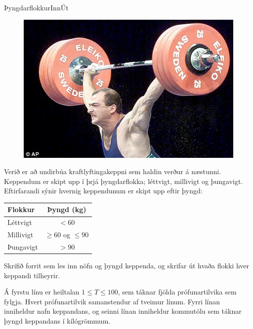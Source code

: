 \begin{problem}{Þyngdarflokkur}{Inn}{Út}{~}{~}

	\begin{figure}
		\vspace{-25pt}
		\begin{center}
			\includegraphics[scale=0.30]{../Thyngdarflokkur/heavyLifting.jpg}
		\end{center}
		\vspace{-30pt}
	\end{figure}

	Verið er að undirbúa kraftlyftingakeppni sem haldin verður á næstunni. Keppendum er skipt upp í þrjá þyngdarflokka; léttvigt, millivigt og þungavigt. Eftirfarandi sýnir hvernig keppendunum er skipt upp eftir þyngd:

	\begin{center}
		\hspace{-10pt}
		\begin{tabular}{lc}
			\hline
			Flokkur & Þyngd (kg) \\
			\hline
			Léttvigt & $< 60$ \\
			Millivigt & $\geq 60$ og $\leq 90$ \\
			Þungavigt & $> 90$ \\
			\hline
		\end{tabular}
	\end{center}

	Skrifið forrit sem les inn nöfn og þyngd keppenda, og skrifar út hvaða flokki hver keppandi tilheyrir.

	\Input
		Á fyrstu línu er heiltalan $1 \leq T \leq 100$, sem táknar fjölda prófunartilvika sem fylgja. Hvert prófunartilvik samanstendur af tveimur línum. Fyrri línan inniheldur nafn keppandans, og seinni línan inniheldur kommutölu sem táknar þyngd keppandans í kílógrömmum.


\end{problem}
